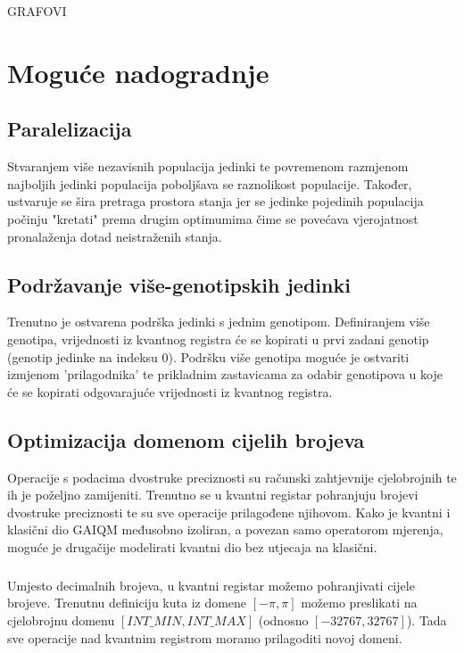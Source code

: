 \documentclass[times, utf8, zavrsni, numeric]{fer}
\begin{document}
GRAFOVI

\chapter{Moguće nadogradnje} \label{ch:nadogradnja}
\section{Paralelizacija}
Stvaranjem više nezavisnih populacija jedinki te povremenom razmjenom najboljih jedinki populacija poboljšava se raznolikost populacije. Također, ustvaruje se šira pretraga prostora stanja jer se jedinke pojedinih populacija počinju "kretati" prema drugim optimumima čime se povećava vjerojatnost pronalaženja dotad neistraženih stanja. \citep{han_phd}

\section{Podržavanje više-genotipskih jedinki}
Trenutno je ostvarena podrška jedinki s jednim genotipom. Definiranjem više genotipa, vrijednosti iz kvantnog registra će se kopirati u prvi zadani genotip (genotip jedinke na indeksu 0). Podršku više genotipa moguće je ostvariti izmjenom 'prilagodnika' te prikladnim zastavicama za odabir genotipova u koje će se kopirati odgovarajuće vrijednosti iz kvantnog registra.

\section{Optimizacija domenom cijelih brojeva}
Operacije s podacima dvostruke preciznosti su računski zahtjevnije cjelobrojnih te ih je poželjno zamijeniti. Trenutno se u kvantni registar pohranjuju brojevi dvostruke preciznosti te su sve operacije prilagođene njihovom. Kako je kvantni i klasični dio GAIQM međusobno izoliran, a povezan samo operatorom mjerenja, moguće je drugačije modelirati kvantni dio bez utjecaja na klasični.

\paragraph{}
Umjesto decimalnih brojeva, u kvantni registar možemo pohranjivati cijele brojeve. Trenutnu definiciju kuta iz domene $[-\pi, \pi]$ možemo preslikati na cjelobrojnu domenu $[INT\_MIN, INT\_MAX]$ (odnosno $[-32767, 32767]$). Tada sve operacije nad kvantnim registrom moramo prilagoditi novoj domeni.
\end{document}
